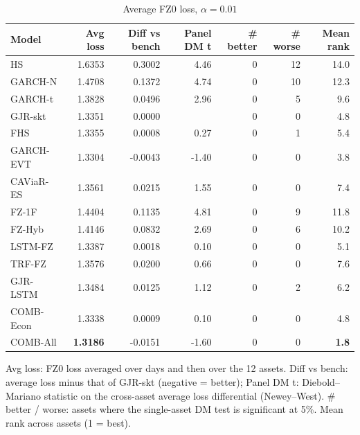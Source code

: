 \begin{table}[htbp]
\centering
\footnotesize
\caption{Average FZ0 loss, $\alpha=0.01$}
\label{tab:loss_a010}
\begin{tabular}{lrrrrrr}
\toprule
Model & Avg loss & Diff vs bench & Panel DM t & \# better & \# worse & Mean rank \\
\midrule
HS & 1.6353 & 0.3002 & 4.46 & 0 & 12 & 14.0 \\
GARCH-N & 1.4708 & 0.1372 & 4.74 & 0 & 10 & 12.3 \\
GARCH-t & 1.3828 & 0.0496 & 2.96 & 0 & 5 & 9.6 \\
GJR-skt & 1.3351 & 0.0000 &  & 0 & 0 & 4.8 \\
FHS & 1.3355 & 0.0008 & 0.27 & 0 & 1 & 5.4 \\
GARCH-EVT & 1.3304 & -0.0043 & -1.40 & 0 & 0 & 3.8 \\
CAViaR-ES & 1.3561 & 0.0215 & 1.55 & 0 & 0 & 7.4 \\
FZ-1F & 1.4404 & 0.1135 & 4.81 & 0 & 9 & 11.8 \\
FZ-Hyb & 1.4146 & 0.0832 & 2.69 & 0 & 6 & 10.2 \\
LSTM-FZ & 1.3387 & 0.0018 & 0.10 & 0 & 0 & 5.1 \\
TRF-FZ & 1.3576 & 0.0200 & 0.66 & 0 & 0 & 7.6 \\
GJR-LSTM & 1.3484 & 0.0125 & 1.12 & 0 & 2 & 6.2 \\
COMB-Econ & 1.3338 & 0.0009 & 0.10 & 0 & 0 & 4.8 \\
COMB-All & \textbf{1.3186} & -0.0151 & -1.60 & 0 & 0 & \textbf{1.8} \\
\bottomrule
\end{tabular}
\par\smallskip\parbox{\linewidth}{\scriptsize Avg loss: FZ0 loss averaged over days and then over the 12 assets. Diff vs bench: average loss minus that of GJR-skt (negative = better); Panel DM t: Diebold--Mariano statistic on the cross-asset average loss differential (Newey--West). \# better / worse: assets where the single-asset DM test is significant at 5\%. Mean rank across assets (1 = best).}
\end{table}